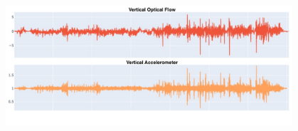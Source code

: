 \begin{figure}[H]
\centering
{}%
\quad
{}%
\label{fig:optical-flow}
\end{figure}

\begin{figure}[H]
\centering
\includegraphics[width=0.95\textwidth,keepaspectratio]{images/4_data/optical-flow-graph.jpg}
\end{figure}




 

